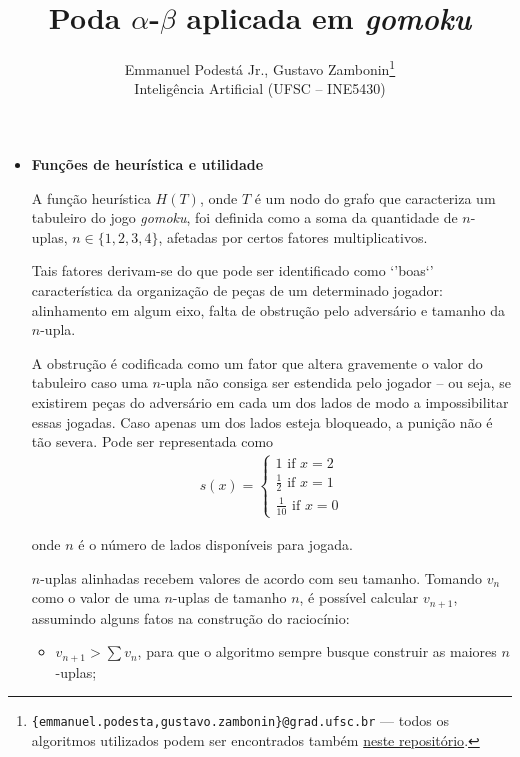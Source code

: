 \documentclass{article}
\title{\textbf{Poda $\alpha$-$\beta$ aplicada em \textit{gomoku}}}
\author{Emmanuel Podestá Jr., Gustavo Zambonin\thanks{
    \texttt{\{emmanuel.podesta,gustavo.zambonin\}@grad.ufsc.br} --- todos os
    algoritmos utilizados podem ser encontrados também
    \href{https://github.com/zambonin/ufsc-ine5430}{neste repositório}.} \\
\small {Inteligência Artificial (UFSC -- INE5430)} \vspace{-5mm}}
\date{}
\begin{document}
\maketitle

\begin{itemize}

    \item \textbf{Funções de heurística e utilidade}

        A função heurística $H(T)$, onde $T$ é um nodo do grafo que
        caracteriza um tabuleiro do jogo \textit{gomoku}, foi definida como
        a soma da quantidade de $n$- uplas, $n \in \{1, 2, 3, 4\}$, afetadas
        por certos fatores multiplicativos.

        Tais fatores derivam-se do que pode ser identificado como `'boas`'
        característica da organização de peças de um determinado jogador:
        alinhamento em algum eixo, falta de obstrução pelo adversário e
        tamanho da $n$-upla.

        A obstrução é codificada como um fator que altera gravemente o valor
        do tabuleiro caso uma $n$-upla não consiga ser estendida pelo jogador
        -- ou seja, se existirem peças do adversário em cada um dos lados
        de modo a impossibilitar essas jogadas. Caso apenas um dos lados
        esteja bloqueado, a punição não é tão severa. Pode ser representada
        como
        \begin{align*}
            s(x) =
            \begin{cases}
                1 \text{ if } x = 2 \\
                \frac{1}{2} \text{ if } x = 1 \\
                \frac{1}{10} \text{ if } x = 0
            \end{cases}
        \end{align*}

        onde $n$ é o número de lados disponíveis para jogada.

        $n$-uplas alinhadas recebem valores de acordo com seu tamanho. Tomando
        $v_n$ como o valor de uma $n$-uplas de tamanho $n$, é possível
        calcular $v_{n + 1}$, assumindo alguns fatos na construção do
        raciocínio:

        \begin{itemize}

            \item $v_{n + 1} > \sum v_n$, para que o algoritmo sempre busque
                construir as maiores $n$-uplas;


\end{itemize}
\end{itemize}
\end{document}
